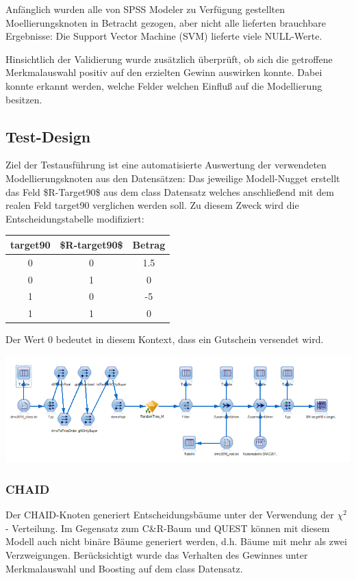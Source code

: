 \documentclass[a4paper,12pt]{article}
\begin{document}
Anfänglich  wurden alle von SPSS Modeler zu Verfügung gestellten Moellierungsknoten in Betracht gezogen, aber nicht alle lieferten brauchbare
Ergebnisse: Die Support Vector Machine (SVM) lieferte viele NULL-Werte.
\par
Hinsichtlich der Validierung wurde zusätzlich überprüft, ob sich die getroffene Merkmalauswahl positiv auf den erzielten Gewinn auswirken konnte. Dabei konnte erkannt werden, welche Felder welchen Einfluß auf die Modellierung besitzen.
\subsection{Test-Design}
Ziel der Testausführung ist eine automatisierte Auswertung der verwendeten Modellierungsknoten aus den Datensätzen:
Das jeweilige Modell-Nugget erstellt das Feld \$R-Target90\$ aus dem class Datensatz welches anschließend mit dem realen Feld target90 verglichen werden soll.
Zu diesem Zweck wird die Entscheidungstabelle modifiziert:
\begin{center}
\begin{tabular}{c | c | c}
target90 & \$R-target90\$ & Betrag
\\
\hline
0 & 0 & 1.5
\\
\hline
0 & 1 & 0
\\
\hline
1 & 0 & -5
\\
\hline
1 & 1  & 0
\end{tabular}
\end{center}
Der Wert 0 bedeutet in diesem Kontext, dass ein Gutschein versendet wird.

\begin{center}
\includegraphics[width=\textwidth]{Screens/test_bewertung}
\end{center}

\subsubsection{CHAID}
Der CHAID-Knoten generiert Entscheidungsbäume unter der Verwendung der $\chi^2$  - Verteilung.
Im Gegensatz zum C\&R-Baum  und QUEST können mit diesem Modell auch nicht binäre Bäume generiert werden, d.h. Bäume mit mehr als zwei
Verzweigungen. Berücksichtigt wurde das Verhalten des Gewinnes unter Merkmalauswahl und Boosting auf dem class Datensatz. 
\end{document}
